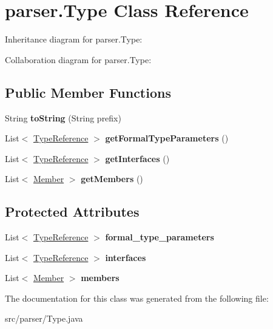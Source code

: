 \hypertarget{classparser_1_1_type}{}\section{parser.\+Type Class Reference}
\label{classparser_1_1_type}


Inheritance diagram for parser.\+Type\+:


Collaboration diagram for parser.\+Type\+:
\subsection*{Public Member Functions}
\begin{DoxyCompactItemize}
\item 
String {\bfseries to\+String} (String prefix)\hypertarget{classparser_1_1_type_a68a5694e883787d66091bfe2da489fc5}{}\label{classparser_1_1_type_a68a5694e883787d66091bfe2da489fc5}

\item 
List$<$ \hyperlink{classparser_1_1_type_reference}{Type\+Reference} $>$ {\bfseries get\+Formal\+Type\+Parameters} ()\hypertarget{classparser_1_1_type_ae1e797f3af1d836854c4ba4a94f7e982}{}\label{classparser_1_1_type_ae1e797f3af1d836854c4ba4a94f7e982}

\item 
List$<$ \hyperlink{classparser_1_1_type_reference}{Type\+Reference} $>$ {\bfseries get\+Interfaces} ()\hypertarget{classparser_1_1_type_a19ff758ffd2764307f85955e20ad9a00}{}\label{classparser_1_1_type_a19ff758ffd2764307f85955e20ad9a00}

\item 
List$<$ \hyperlink{classparser_1_1_member}{Member} $>$ {\bfseries get\+Members} ()\hypertarget{classparser_1_1_type_a069e3fe35dc94aa715ffd5f41485348e}{}\label{classparser_1_1_type_a069e3fe35dc94aa715ffd5f41485348e}

\end{DoxyCompactItemize}
\subsection*{Protected Attributes}
\begin{DoxyCompactItemize}
\item 
List$<$ \hyperlink{classparser_1_1_type_reference}{Type\+Reference} $>$ {\bfseries formal\+\_\+type\+\_\+parameters}\hypertarget{classparser_1_1_type_a5bc56093787f90c8e073dd54bae09c8b}{}\label{classparser_1_1_type_a5bc56093787f90c8e073dd54bae09c8b}

\item 
List$<$ \hyperlink{classparser_1_1_type_reference}{Type\+Reference} $>$ {\bfseries interfaces}\hypertarget{classparser_1_1_type_a0d64e38aae305dc98462b7f6b5f9cc6e}{}\label{classparser_1_1_type_a0d64e38aae305dc98462b7f6b5f9cc6e}

\item 
List$<$ \hyperlink{classparser_1_1_member}{Member} $>$ {\bfseries members}\hypertarget{classparser_1_1_type_a1cf896587a335a774c16448f9d3723f9}{}\label{classparser_1_1_type_a1cf896587a335a774c16448f9d3723f9}

\end{DoxyCompactItemize}


The documentation for this class was generated from the following file\+:\begin{DoxyCompactItemize}
\item 
src/parser/Type.\+java\end{DoxyCompactItemize}

